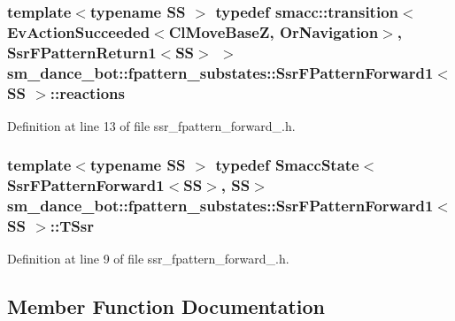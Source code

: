 \subsubsection[{\texorpdfstring{reactions}{reactions}}]{\setlength{\rightskip}{0pt plus 5cm}template$<$typename SS $>$ typedef {\bf smacc\+::transition}$<$Ev\+Action\+Succeeded$<${\bf Cl\+Move\+BaseZ}, {\bf Or\+Navigation}$>$, {\bf Ssr\+F\+Pattern\+Return1}$<$SS$>$ $>$ {\bf sm\+\_\+dance\+\_\+bot\+::fpattern\+\_\+substates\+::\+Ssr\+F\+Pattern\+Forward1}$<$ SS $>$\+::{\bf reactions}}\hypertarget{structsm__dance__bot_1_1fpattern__substates_1_1SsrFPatternForward1_ad3d07ddf82683b15b1380c863c41bce4}{}\label{structsm__dance__bot_1_1fpattern__substates_1_1SsrFPatternForward1_ad3d07ddf82683b15b1380c863c41bce4}


Definition at line 13 of file ssr\+\_\+fpattern\+\_\+forward\+\_.\+h.

\subsubsection[{\texorpdfstring{T\+Ssr}{TSsr}}]{\setlength{\rightskip}{0pt plus 5cm}template$<$typename SS $>$ typedef {\bf Smacc\+State}$<${\bf Ssr\+F\+Pattern\+Forward1}$<$SS$>$, SS$>$ {\bf sm\+\_\+dance\+\_\+bot\+::fpattern\+\_\+substates\+::\+Ssr\+F\+Pattern\+Forward1}$<$ SS $>$\+::{\bf T\+Ssr}}\hypertarget{structsm__dance__bot_1_1fpattern__substates_1_1SsrFPatternForward1_a8e3e02ba5aebcb3d42d8f7c6f7c123ff}{}\label{structsm__dance__bot_1_1fpattern__substates_1_1SsrFPatternForward1_a8e3e02ba5aebcb3d42d8f7c6f7c123ff}


Definition at line 9 of file ssr\+\_\+fpattern\+\_\+forward\+\_.\+h.



\subsection{Member Function Documentation}
